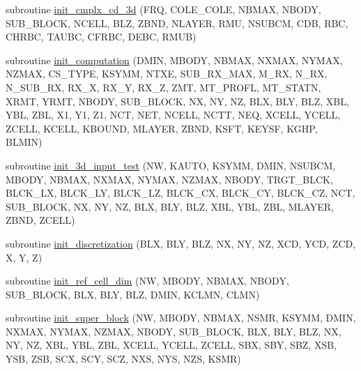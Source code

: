 \begin{DoxyCompactItemize}
\item 
subroutine \hyperlink{Marco_8f90_aaf5e8f1fe701ea6d58511ac2fabcd83c}{init\+\_\+cmplx\+\_\+cd\+\_\+3d} (F\+RQ, C\+O\+L\+E\+\_\+\+C\+O\+LE, N\+B\+M\+AX, N\+B\+O\+DY, S\+U\+B\+\_\+\+B\+L\+O\+CK, N\+C\+E\+LL, B\+LZ, Z\+B\+ND, N\+L\+A\+Y\+ER, R\+MU, N\+S\+U\+B\+CM, C\+DB, R\+BC, C\+H\+R\+BC, T\+A\+U\+BC, C\+F\+R\+BC, D\+E\+BC, R\+M\+UB)
\item 
subroutine \hyperlink{Marco_8f90_a5f04384a88b1293a8d2dc26d86a77d08}{init\+\_\+computation} (D\+M\+IN, M\+B\+O\+DY, N\+B\+M\+AX, N\+X\+M\+AX, N\+Y\+M\+AX, N\+Z\+M\+AX, C\+S\+\_\+\+T\+Y\+PE, K\+S\+Y\+MM, N\+T\+XE, S\+U\+B\+\_\+\+R\+X\+\_\+\+M\+AX, M\+\_\+\+RX, N\+\_\+\+RX, N\+\_\+\+S\+U\+B\+\_\+\+RX, R\+X\+\_\+X, R\+X\+\_\+Y, R\+X\+\_\+Z, Z\+MT, M\+T\+\_\+\+P\+R\+O\+FL, M\+T\+\_\+\+S\+T\+A\+TN, X\+R\+MT, Y\+R\+MT, N\+B\+O\+DY, S\+U\+B\+\_\+\+B\+L\+O\+CK, NX, NY, NZ, B\+LX, B\+LY, B\+LZ, X\+BL, Y\+BL, Z\+BL, X1, Y1, Z1, N\+CT, N\+ET, N\+C\+E\+LL, N\+C\+TT, N\+EQ, X\+C\+E\+LL, Y\+C\+E\+LL, Z\+C\+E\+LL, K\+C\+E\+LL, K\+B\+O\+U\+ND, M\+L\+A\+Y\+ER, Z\+B\+ND, K\+S\+FT, K\+E\+Y\+SF, K\+G\+HP, B\+L\+M\+IN)
\item 
subroutine \hyperlink{Marco_8f90_afdb11dbe2b5041f4f314349b7334b974}{init\+\_\+3d\+\_\+input\+\_\+test} (NW, K\+A\+U\+TO, K\+S\+Y\+MM, D\+M\+IN, N\+S\+U\+B\+CM, M\+B\+O\+DY, N\+B\+M\+AX, N\+X\+M\+AX, N\+Y\+M\+AX, N\+Z\+M\+AX, N\+B\+O\+DY, T\+R\+G\+T\+\_\+\+B\+L\+CK, B\+L\+C\+K\+\_\+\+LX, B\+L\+C\+K\+\_\+\+LY, B\+L\+C\+K\+\_\+\+LZ, B\+L\+C\+K\+\_\+\+CX, B\+L\+C\+K\+\_\+\+CY, B\+L\+C\+K\+\_\+\+CZ, N\+CT, S\+U\+B\+\_\+\+B\+L\+O\+CK, NX, NY, NZ, B\+LX, B\+LY, B\+LZ, X\+BL, Y\+BL, Z\+BL, M\+L\+A\+Y\+ER, Z\+B\+ND, Z\+C\+E\+LL)
\item 
subroutine \hyperlink{Marco_8f90_aca2a0c5479ec07e65782fa62da433365}{init\+\_\+discretization} (B\+LX, B\+LY, B\+LZ, NX, NY, NZ, X\+CD, Y\+CD, Z\+CD, X, Y, Z)
\item 
subroutine \hyperlink{Marco_8f90_abe7f527d74ea96643956d52265c43729}{init\+\_\+ref\+\_\+cell\+\_\+dim} (NW, M\+B\+O\+DY, N\+B\+M\+AX, N\+B\+O\+DY, S\+U\+B\+\_\+\+B\+L\+O\+CK, B\+LX, B\+LY, B\+LZ, D\+M\+IN, K\+C\+L\+MN, C\+L\+MN)
\item 
subroutine \hyperlink{Marco_8f90_ac268fba86b567389312bb1f5945bec19}{init\+\_\+super\+\_\+block} (NW, M\+B\+O\+DY, N\+B\+M\+AX, N\+S\+MR, K\+S\+Y\+MM, D\+M\+IN, N\+X\+M\+AX, N\+Y\+M\+AX, N\+Z\+M\+AX, N\+B\+O\+DY, S\+U\+B\+\_\+\+B\+L\+O\+CK, B\+LX, B\+LY, B\+LZ, NX, NY, NZ, X\+BL, Y\+BL, Z\+BL, X\+C\+E\+LL, Y\+C\+E\+LL, Z\+C\+E\+LL, S\+BX, S\+BY, S\+BZ, X\+SB, Y\+SB, Z\+SB, S\+CX, S\+CY, S\+CZ, N\+XS, N\+YS, N\+ZS, K\+S\+MR)

\end{DoxyCompactItemize}
